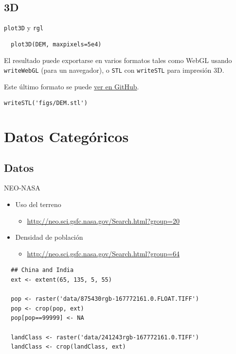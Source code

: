 \documentclass[xcolor={usenames,svgnames,dvipsnames}]{beamer}
\begin{document}
\subsection{3D}
\label{sec-2-4}

\begin{frame}[fragile,label=sec-2-4-1]{\texttt{plot3D} y \texttt{rgl}}
 \lstset{language=R,label= ,caption= ,numbers=none}
\begin{lstlisting}
  plot3D(DEM, maxpixels=5e4)
\end{lstlisting}

\begin{block}{}
El resultado puede exportarse en varios formatos tales como WebGL
usando \texttt{writeWebGL} (para un navegador), o \texttt{STL} con \texttt{writeSTL} para
impresión 3D. 

Este último formato se puede \href{https://github.com/oscarperpinan/spacetime-vis/blob/gh-pages/images/DEM.stl}{ver en GitHub}.

\lstset{language=R,label= ,caption= ,numbers=none}
\begin{lstlisting}
writeSTL('figs/DEM.stl')
\end{lstlisting}
\end{block}
\end{frame}

\section{Datos Categóricos}
\label{sec-3}

\subsection{Datos}
\label{sec-3-1}

\begin{frame}[fragile,label=sec-3-1-1]{NEO-NASA}
 \begin{itemize}
\item Uso del terreno
\begin{itemize}
\item \url{http://neo.sci.gsfc.nasa.gov/Search.html?group=20}
\end{itemize}
\item Densidad de población
\begin{itemize}
\item \url{http://neo.sci.gsfc.nasa.gov/Search.html?group=64}
\end{itemize}
\end{itemize}
\lstset{language=R,label= ,caption= ,numbers=none}
\begin{lstlisting}
  ## China and India  
  ext <- extent(65, 135, 5, 55)
  
  pop <- raster('data/875430rgb-167772161.0.FLOAT.TIFF')
  pop <- crop(pop, ext)
  pop[pop==99999] <- NA
  
  landClass <- raster('data/241243rgb-167772161.0.TIFF')
  landClass <- crop(landClass, ext)
\end{lstlisting}
\end{frame}
\end{document}
